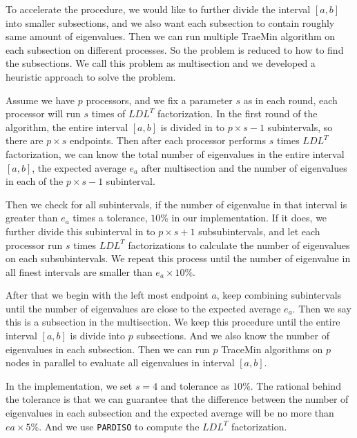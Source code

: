To accelerate the procedure, we would like to further divide the interval $[a,b]$ into smaller subsections, and we also want each subsection to contain roughly same amount of eigenvalues. Then we can run multiple TraeMin algorithm on each subsection on different processes. So the problem is reduced to how to find the subsections. We call this problem as multisection and we developed a heuristic approach to solve the problem.

Assume we have $p$ processors, and we fix a parameter $s$ as in each round, each processor will run $s$ times of $LDL^T$ factorization. In the first round of the algorithm, the entire interval $[a, b]$ is divided in to $p \times s - 1$ subintervals, so there are $p \times s$ endpoints. Then after each processor performs $s$ times $LDL^T$ factorization, we can know the total number of eigenvalues in the entire interval $[a,b]$, the expected average $e_a$ after multisection and the number of eigenvalues in each of the $p \times s-1$ subinterval.

Then we check for all subintervals, if the number of eigenvalue in that interval is greater than $e_a$ times a tolerance, $10\%$ in our implementation. If it does, we further divide this subinterval in to $p \times s+1$ subsubintervals, and let each processor run $s$ times $LDL^T$ factorizations to calculate the number of eigenvalues on each subsubintervals. We repeat this process until the number of eigenvalue in all finest intervals are smaller than $e_a \times 10\%$. 

After that we begin with the left most endpoint $a$, keep combining subintervals until the number of eigenvalues are close to the expected average $e_a$. Then we say this is a subsection in the multisection. We keep this procedure until the entire interval $[a,b]$ is divide into $p$ subsections. And we also know the number of eigenvalues in each subsection. Then we can run $p$ TraceMin algorithms on $p$ nodes in parallel to evaluate all eigenvalues in interval $[a,b]$.

In the implementation, we set $s = 4$ and tolerance as $10\%$. The rational behind the tolerance is that we can guarantee that the difference between the number of eigenvalues in each subsection and the expected average will be no more than $ea \times 5\%$. And we use {\tt PARDISO} to compute the $LDL^T$ factorization.


